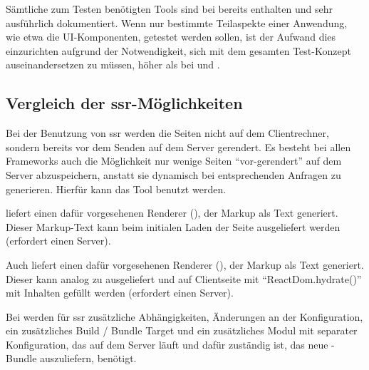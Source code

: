Sämtliche zum Testen benötigten Tools sind bei  bereits enthalten und sehr ausführlich dokumentiert. Wenn nur bestimmte Teilaspekte einer Anwendung, wie etwa die UI-Komponenten, getestet werden sollen, ist der Aufwand dies einzurichten aufgrund der Notwendigkeit, sich mit dem gesamten Test-Konzept auseinandersetzen zu müssen, höher als bei  und .

\subsection{Vergleich der \acrlong{ssr}-Möglichkeiten}
Bei der Benutzung von \gls{ssr} werden die Seiten nicht auf dem Clientrechner, sondern bereits vor dem Senden auf dem Server gerendert. Es besteht bei allen Frameworks auch die Möglichkeit nur wenige Seiten \enquote{vor-gerendert} auf dem Server abzuspeichern, anstatt sie dynamisch bei entsprechenden Anfragen zu generieren. Hierfür kann das  Tool  benutzt werden.

 liefert einen dafür vorgesehenen Renderer (), der Markup als Text generiert. Dieser Markup-Text kann beim initialen Laden der Seite ausgeliefert werden (erfordert einen  Server).

Auch  liefert einen dafür vorgesehenen Renderer (), der Markup als Text generiert. Dieser kann analog zu  ausgeliefert und auf Clientseite mit \enquote{ReactDom.hydrate()} mit Inhalten gefüllt werden (erfordert einen  Server).
    
Bei  werden für \gls{ssr} zusätzliche Abhängigkeiten, Änderungen an der Konfiguration, ein zusätzliches Build / Bundle Target und ein zusätzliches Modul mit separater Konfiguration, das auf dem Server läuft und dafür zuständig ist, das neue -Bundle auszuliefern, benötigt.

